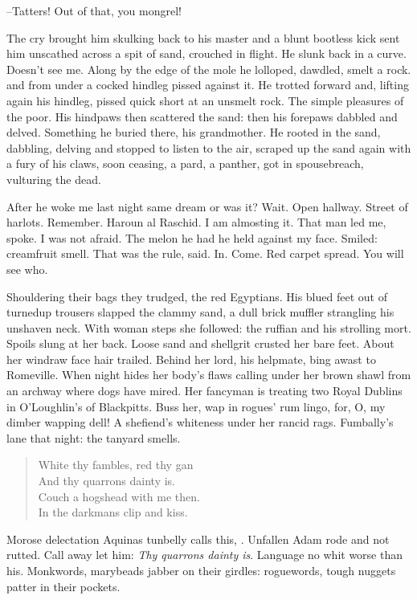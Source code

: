 --Tatters!
Out of that, you mongrel!

The cry brought him skulking back to his master
and a blunt bootless kick sent him unscathed
across a spit of sand, crouched in flight.
He slunk back in a curve.
Doesn't see me.
Along by the edge of the mole
he lolloped, dawdled, smelt a rock.
and from under a cocked hindleg
pissed against it.
He trotted forward and, lifting again his hindleg,
pissed quick short at an unsmelt rock.
The simple pleasures of the poor.
His hindpaws then scattered the sand:
then his forepaws dabbled and delved.
Something he buried there, his grandmother.
He rooted in the sand,
dabbling, delving
and stopped to listen to the air,
scraped up the sand
again with a fury of his claws,
soon ceasing, a pard, a panther,
got in spousebreach,
vulturing the dead.

After he woke me last night same dream or was it?
Wait.
Open hallway.
Street of harlots.
Remember.
Haroun al Raschid.
I am almosting it.
That man led me, spoke.
I was not afraid.
The melon he had he held against my face.
Smiled:
creamfruit smell.
That was the rule, said.
In.
Come.
Red carpet spread.
You will see who.

Shouldering their bags they trudged, the red Egyptians.
His blued feet out of turnedup trousers
slapped the clammy sand,
a dull brick muffler strangling his unshaven neck.
With woman steps she followed:
the ruffian and his strolling mort.
Spoils slung at her back.
Loose sand and shellgrit crusted her bare feet.
About her windraw face hair trailed.
Behind her lord, his helpmate, bing awast to Romeville.
When night hides her body's flaws
calling under her brown shawl from an archway where dogs have mired.
Her fancyman is treating two Royal Dublins in O'Loughlin's of Blackpitts.
Buss her, wap in rogues' rum lingo,
for, O, my dimber wapping dell!
A shefiend's whiteness under her rancid rags.
Fumbally's lane that night:
the tanyard smells.


\begin{verse}
    White thy fambles, red thy gan \\
    And thy quarrons dainty is. \\
    Couch a hogshead with me then. \\
    In the darkmans clip and kiss.
\end{verse}


Morose delectation Aquinas tunbelly calls this, .
Unfallen Adam rode and not rutted.
Call away let him:
\emph{Thy quarrons dainty is}.
Language no whit worse than his.
Monkwords, marybeads jabber on their girdles:
roguewords, tough nuggets patter in their pockets.

